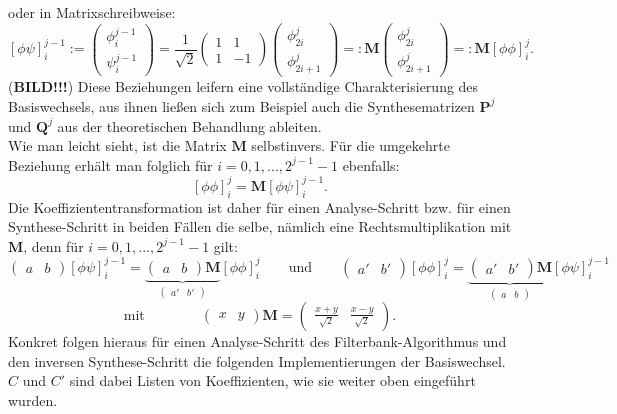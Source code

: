 oder in Matrixschreibweise:
\[
\left[ \phi\psi \right]_{i}^{j-1}
:=
\begin{pmatrix}
\phi_{i}^{j-1} \\
\psi_{i}^{j-1}
\end{pmatrix}
=
\frac{1}{\sqrt{2}}
\begin{pmatrix}
1 & 1 \\
1 & -1
\end{pmatrix}
\begin{pmatrix}
\phi_{2i}^{j} \\
\phi_{2i+1}^{j}
\end{pmatrix}
=:
\mathbf{M}
\begin{pmatrix}
\phi_{2i}^{j} \\
\phi_{2i+1}^{j}
\end{pmatrix}
=:
\mathbf{M}
\left[ \phi\phi \right]_{i}^j
.
\]
%
(\textbf{BILD!!!}) Diese Beziehungen leifern eine vollständige Charakterisierung des Basiswechsels, aus ihnen ließen sich zum Beispiel auch die Synthesematrizen $\mathbf{P}^j$ und $\mathbf{Q}^j$ aus der theoretischen Behandlung ableiten.\\
Wie man leicht sieht, ist die Matrix $\mathbf{M}$ selbstinvers. Für die umgekehrte Beziehung erhält man folglich für $i = 0, 1, ..., 2^{j-1}-1$ ebenfalls:
%
\[
\left[ \phi\phi \right]_{i}^j
=
\mathbf{M}
\left[ \phi\psi \right]_{i}^{j-1}
.
\]
%
Die Koeffiziententransformation ist daher für einen Analyse-Schritt bzw. für einen Synthese-Schritt in beiden Fällen die selbe, nämlich eine Rechtsmultiplikation mit $\mathbf{M}$, denn für $i = 0, 1, ..., 2^{j-1}-1$ gilt:
%
\[
\begin{pmatrix}
a & b
\end{pmatrix}
\left[ \phi\psi \right]_{i}^{j-1}
=
\underbrace{
\begin{pmatrix}
a & b
\end{pmatrix}
\mathbf{M}
}_{
\begin{pmatrix}
a' & b'
\end{pmatrix}
}
\left[ \phi\phi \right]_{i}^j
\qquad \mbox{und} \qquad
\begin{pmatrix}
a' & b'
\end{pmatrix}
\left[ \phi\phi \right]_{i}^j
=
\underbrace{
\begin{pmatrix}
a' & b'
\end{pmatrix}
\mathbf{M}
}_{
\begin{pmatrix}
a & b
\end{pmatrix}
}
\left[ \phi\psi \right]_{i}^{j-1}
\]
%
\[
\mbox{mit} \qquad \qquad
\begin{pmatrix}
x & y
\end{pmatrix}
\mathbf{M}
=
\begin{pmatrix}
\frac{x+y}{\sqrt{2}} & \frac{x-y}{\sqrt{2}}
\end{pmatrix}
.
\]
%
Konkret folgen hieraus für einen Analyse-Schritt des Filterbank-Algorithmus und den inversen Synthese-Schritt die folgenden Implementierungen der Basiswechsel. $C$ und $C'$ sind dabei Listen von Koeffizienten, wie sie weiter oben eingeführt wurden.

